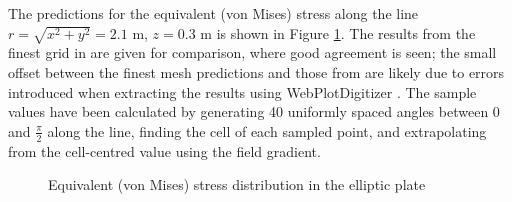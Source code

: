 \documentclass[sn-mathphys,Numbered]{sn-jnl}%
\begin{document}
The predictions for the equivalent (von Mises) stress along the line $r = \sqrt{x^2 + y^2} = 2.1$ m, $z = 0.3$ m is shown in Figure \ref{fig:elliptic_plate_sigmaEq}.
The results from the finest grid in \citet{Demirdzic1997a} are given for comparison, where good agreement is seen;
the small offset between the finest mesh predictions and those from \citet{Demirdzic1997a} are likely due to errors introduced when extracting the \citet{Demirdzic1997a} results using WebPlotDigitizer \citep{WebPlotDigitizer}.
The sample values have been calculated by generating 40 uniformly spaced angles between 0 and $\frac{\pi}{2}$ along the line, finding the cell of each sampled point, and extrapolating from the cell-centred value using the field gradient.
\begin{figure}[htbp]
   \centering
   \caption{Equivalent (von Mises) stress distribution in the elliptic plate}
   \label{fig:elliptic_plate_sigmaEq}
\end{figure}
\end{document}

